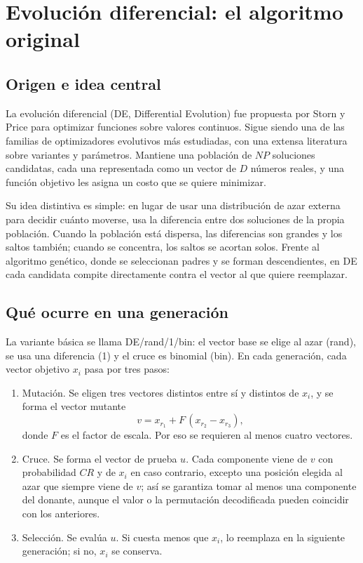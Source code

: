 \section{Evolución diferencial: el algoritmo original}
\subsection{Origen e idea central}
La evolución diferencial (DE, Differential Evolution) fue propuesta por Storn y Price para optimizar funciones sobre valores continuos.\cite{de10} Sigue siendo una de las familias de optimizadores evolutivos más estudiadas, con una extensa literatura sobre variantes y parámetros.\cite{de11} Mantiene una población de $NP$ soluciones candidatas, cada una representada como un vector de $D$ números reales, y una función objetivo les asigna un costo que se quiere minimizar.

Su idea distintiva es simple: en lugar de usar una distribución de azar externa para decidir cuánto moverse, usa la diferencia entre dos soluciones de la propia población. Cuando la población está dispersa, las diferencias son grandes y los saltos también; cuando se concentra, los saltos se acortan solos. Frente al algoritmo genético, donde se seleccionan padres y se forman descendientes, en DE cada candidata compite directamente contra el vector al que quiere reemplazar.\cite{de10}

\subsection{Qué ocurre en una generación}
La variante básica se llama DE/rand/1/bin: el vector base se elige al azar (rand), se usa una diferencia (1) y el cruce es binomial (bin).\cite{de10} En cada generación, cada vector objetivo $x_i$ pasa por tres pasos:
\begin{enumerate}[leftmargin=*]
\item Mutación. Se eligen tres vectores distintos entre sí y distintos de $x_i$, y se forma el vector mutante
\begin{equation}
v=x_{r_1}+F\,(x_{r_2}-x_{r_3}),\label{de:eq:mut}
\end{equation}
donde $F$ es el factor de escala. Por eso se requieren al menos cuatro vectores.\cite{de10}
\item Cruce. Se forma el vector de prueba $u$. Cada componente viene de $v$ con probabilidad $CR$ y de $x_i$ en caso contrario, excepto una posición elegida al azar que siempre viene de $v$; así se garantiza tomar al menos una componente del donante, aunque el valor o la permutación decodificada pueden coincidir con los anteriores.\cite{de10}
\item Selección. Se evalúa $u$. Si cuesta menos que $x_i$, lo reemplaza en la siguiente generación; si no, $x_i$ se conserva.\cite{de10}
\end{enumerate}

